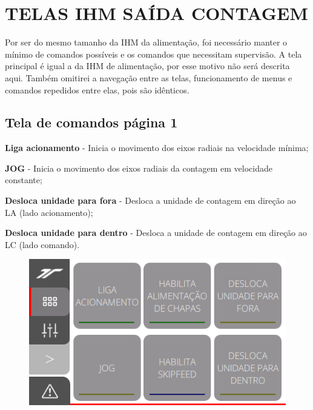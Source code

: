 \thispagestyle{fancy}
\vspace*{40 pt}
\section{\large{\MakeUppercase{Telas IHM saída contagem}}}
 Por ser do mesmo tamanho da IHM da alimentação, foi necessário manter o mínimo de comandos possíveis e os comandos que necessitam supervisão.
 A tela principal é igual a da IHM de alimentação, por esse motivo não será descrita aqui. Também omitirei a navegação entre as telas, funcionamento de menus
 e comandos repedidos entre elas, pois são idênticos.

\subsection{\small{Tela de comandos página 1}}\label{telaComandosSaidaContagem}

\begin{commandsInCount}
  \item[\ding{\dingNumber}] \textbf{Liga acionamento} - Inicia o movimento dos eixos radiais na velocidade mínima;
  \item[\ding{\dingNumber}] \textbf{JOG} - Inicia o movimento dos eixos radiais da contagem em velocidade constante;
  \item[\ding{\dingNumber}] \textbf{Desloca unidade para fora} - Desloca a unidade de contagem em direção ao LA (lado acionamento);
  \item[\ding{\dingNumber}] \textbf{Desloca unidade para dentro} - Desloca a unidade de contagem em direção ao LC (lado comando).
\end{commandsInCount}

\vspace*{\fill}
\begin{figure}[h]
  \centering
  \includegraphics{src/imagesFlexo/12-IHMCNT/e-2.png}
\end{figure}
\vspace*{\fill}

